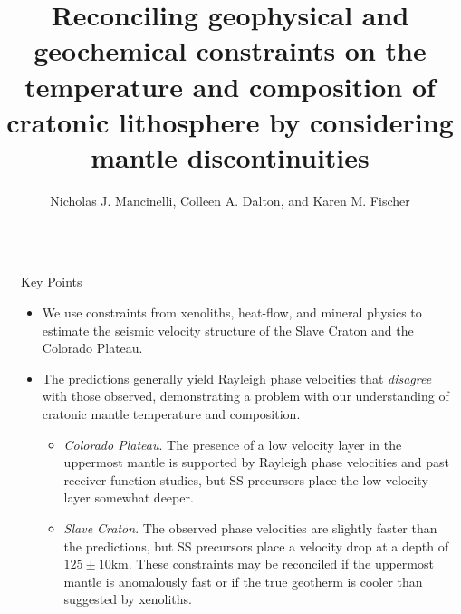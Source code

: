 \documentclass[final]{beamer}
\title{Reconciling geophysical and geochemical constraints on the temperature and composition of cratonic lithosphere by considering mantle discontinuities} %
\author{Nicholas J. Mancinelli, Colleen A. Dalton, and Karen M. Fischer} %
\institute{Department of Earth, Environmental, and Planetary Sciences; Brown University} %
\newlength{\sepwid}
\newlength{\onecolwid}
\begin{document}

\setlength{\belowcaptionskip}{2ex} %
\setlength\belowdisplayshortskip{2ex} %

\begin{frame}[t] %

\begin{columns}[t] %

\begin{column}{\sepwid}\end{column} %

\begin{column}{\onecolwid} %


\begin{alertblock}{Key Points}
\begin{itemize}
\item We use constraints from xenoliths, heat-flow, and mineral physics to estimate the seismic velocity structure of the Slave Craton and the Colorado Plateau.

\item The predictions generally yield Rayleigh phase velocities that \emph{disagree} with those observed, demonstrating a problem with our understanding of cratonic mantle temperature and composition.

\begin{itemize}

\item \emph{Colorado Plateau}. The presence of a low velocity layer in the uppermost mantle is supported by Rayleigh phase velocities and past receiver function studies, but SS precursors place the low velocity layer somewhat deeper.

\item \emph{Slave Craton}. The observed phase velocities are slightly faster than the predictions, but SS precursors place a velocity drop at a depth of $125\pm10$km.  These constraints may be reconciled if the uppermost mantle is anomalously fast or if the true geotherm is cooler than suggested by xenoliths.


\end{itemize}
\end{itemize}
\end{alertblock}
\end{column}
\end{columns}
\end{frame}
\end{document}

